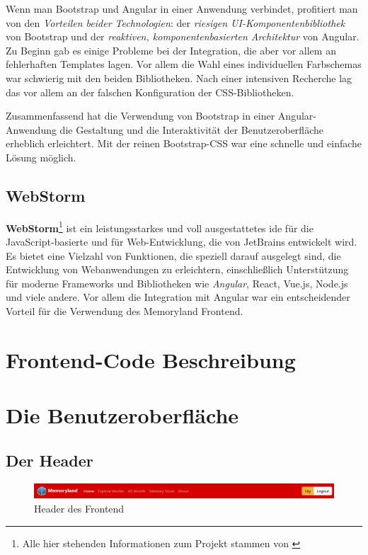 Wenn man Bootstrap und Angular in einer Anwendung verbindet, profitiert man von den \emph{Vorteilen beider Technologien}: der \emph{riesigen UI-Komponentenbibliothek} von Bootstrap und der \emph{reaktiven, komponentenbasierten Architektur} von Angular. Zu Beginn gab es einige Probleme bei der Integration, die aber vor allem an fehlerhaften Templates lagen. Vor allem die Wahl eines individuellen Farbschemas war schwierig mit den beiden Bibliotheken. Nach einer intensiven Recherche lag das vor allem an der falschen Konfiguration der CSS-Bibliotheken.

Zusammenfassend hat die Verwendung von Bootstrap in einer Angular-Anwendung die Gestaltung und die Interaktivität der Benutzeroberfläche erheblich erleichtert. Mit der reinen Bootstrap-CSS war eine schnelle und einfache Lösung möglich.


\subsection{WebStorm}

\textbf{WebStorm}\footnote{Alle hier stehenden Informationen zum Projekt stammen von \cite{Webstorm}}  ist ein leistungsstarkes und voll ausgestattetes \Gls{ide} für die JavaScript-basierte und für Web-Entwicklung, die von JetBrains entwickelt wird. Es bietet eine Vielzahl von Funktionen, die speziell darauf ausgelegt sind, die Entwicklung von Webanwendungen zu erleichtern, einschlie\ss{}lich Unterstützung für moderne Frameworks und Bibliotheken wie \emph{Angular}, React, Vue.js, Node.js und viele andere. Vor allem die Integration mit Angular war ein entscheidender Vorteil für die Verwendung des Memoryland Frontend.


\section{Frontend-Code Beschreibung}



\section{Die Benutzeroberfläche}

\subsection{Der Header}

\begin{figure} [h t]
    \centering
    \includegraphics[scale=0.5]{pics/header_login.PNG}
    \caption{Header des Frontend}
    \label{fig:header-frontend}
\end{figure}

